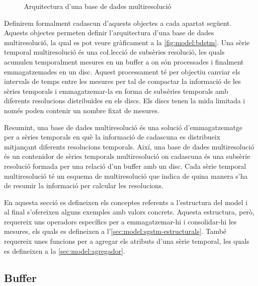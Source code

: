 \begin{figure}[tp]
\centering

\caption{Arquitectura d'una base de dades multiresolució}
\label{fig:model:bdstm}
\end{figure}

Definirem formalment cadascun d'aquests objectes a cada apartat
següent.  Aquests objectes permeten definir l'arquitectura d'una base
de dades multiresolució, la qual es pot veure gràficament a la
\autoref{fig:model:bdstm}.  Una sèrie temporal multiresolució és una
co\l.lecció de subsèries resolució, les quals acumulen temporalment
mesures en un buffer a on són processades i finalment emmagatzemades
en un disc. Aquest processament té per objectiu canviar els intervals
de temps entre les mesures per tal de compactar la informació de les
sèries temporals i emmagatzemar-la en forma de subsèries temporals amb
diferents resolucions distribuïdes en els discs. Els discs tenen la
mida limitada i només poden contenir un nombre fixat de
mesures.%


Resumint, una base de dades multiresolució és una
solució d'emmagatzematge per a sèries temporals en què la informació
de cadascuna es distribueix mitjançant diferents resolucions
temporals. Així, una base de dades multiresolució és un contenidor de
sèries temporals multiresolució on cadascuna és una subsèrie resolució
formada per una relació d'un buffer amb un disc. Cada sèrie temporal
multiresolució té un esquema de multiresolució que indica de quina
manera s'ha de resumir la informació per calcular les resolucions.






En aquesta secció es defineixen els conceptes referents a l'estructura
del model i al final s'ofereixen alguns exemples amb valors
concrets. Aquesta estructura, però, requereix uns operadors específics
per a emmagatzemar-hi i consolidar-hi les mesures, els quals es
defineixen a l'\autoref{sec:model:sgstm-estructurals}. També requereix
unes funcions per a agregar els atributs d'una sèrie temporal, les
quals es defineixen a la \autoref{sec:model:agregador}.




\subsection{Buffer}\label{sec:model:buffer}



